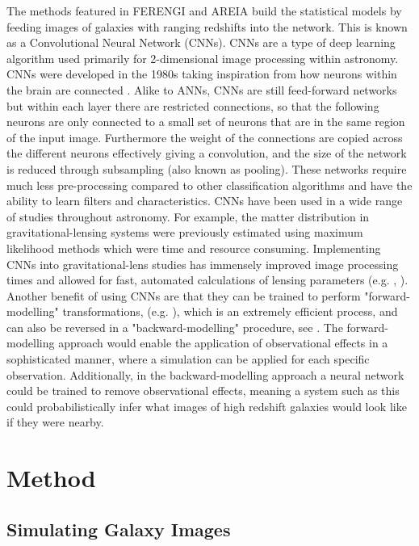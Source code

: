 \documentclass[fleqn,usenatbib]{mnras}
\begin{document}
The methods featured in FERENGI and AREIA build the statistical models by feeding images of galaxies with ranging redshifts into the network. This is known as a Convolutional Neural Network (CNNs). CNNs are a type of deep learning algorithm used primarily for 2-dimensional image processing within astronomy. CNNs were developed in the 1980s taking inspiration from how neurons within the brain are connected \citep{LeCun1995}. Alike to ANNs, CNNs are still feed-forward networks but within each layer there are restricted connections, so that the following neurons are only connected to a small set of neurons that are in the same region of the input image. Furthermore the weight of the connections are copied across the different neurons effectively giving a convolution, and the size of the network is reduced through subsampling (also known as pooling). These networks require much less pre-processing compared to other classification algorithms and have the ability to learn filters and characteristics. CNNs have been used in a wide range of studies throughout astronomy. For example, the matter distribution in gravitational-lensing systems were previously estimated using maximum likelihood methods which were time and resource consuming. Implementing CNNs into gravitational-lens studies has immensely improved image processing times and allowed for fast, automated calculations of lensing parameters (e.g. \cite{Hezaveh2017}, \cite{Levasseur2017}).
Another benefit of using CNNs are that they can be trained to perform "forward-modelling" transformations, (e.g. \citet{Huertas-Company2018, Perez2019}), which is an extremely efficient process, and can also be reversed in a "backward-modelling" procedure, see \citet{Schawinski2017}. The forward-modelling approach would enable the application of observational effects in a sophisticated manner, where a simulation can be applied for each specific observation. Additionally, in the backward-modelling approach a neural network could be trained to remove observational effects, meaning a system such as this could probabilistically infer what images of high redshift galaxies would look like if they were nearby. 

\section{Method}

\subsection{Simulating Galaxy Images} %
\label{sec:simulate}
\end{document}
